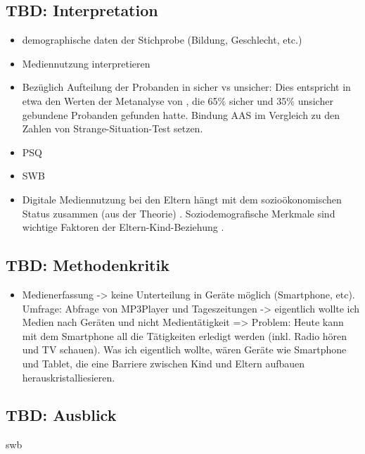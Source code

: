 \subsection{TBD: Interpretation} \label{sec:Interpretation}
\begin{itemize}
    \item demographische daten der Stichprobe (Bildung, Geschlecht, etc.)
    \item Mediennutzung interpretieren
    \item Bezüglich Aufteilung der Probanden in sicher vs unsicher: Dies entspricht in etwa den Werten der Metanalyse von , die 65\% sicher und 35\% unsicher gebundene Probanden gefunden hatte. Bindung AAS im Vergleich zu den Zahlen von Strange-Situation-Test setzen.
    \item PSQ
    \item SWB
    \item Digitale Mediennutzung bei den Eltern hängt mit dem sozioökonomischen Status zusammen (aus der Theorie) \cite{Livingstone2015}. Soziodemografische Merkmale sind wichtige Faktoren der Eltern-Kind-Beziehung \cite{Kammerl2012}.
\end{itemize}

\subsection{TBD: Methodenkritik} \label{sec:Methodenkritik}
\begin{itemize}
    \item Medienerfassung -> keine Unterteilung in Geräte möglich (Smartphone, etc). Umfrage: Abfrage von MP3Player und Tageszeitungen -> eigentlich wollte ich Medien nach Geräten und nicht Medientätigkeit => Problem: Heute kann mit dem Smartphone all die Tätigkeiten erledigt werden (inkl. Radio hören und TV schauen). Was ich eigentlich wollte, wären Geräte wie Smartphone und Tablet, die eine Barriere zwischen Kind und Eltern aufbauen herauskristalliesieren.
\end{itemize}

\subsection{TBD: Ausblick} \label{sec:Ausblick}
\gls{swb}